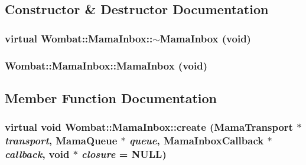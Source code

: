 \subsection{Constructor \& Destructor Documentation}
\hypertarget{classWombat_1_1MamaInbox_aff9af1b965c0992572aa78d707f5d6e4}{
\subsubsection[{$\sim$MamaInbox}]{\setlength{\rightskip}{0pt plus 5cm}virtual Wombat::MamaInbox::$\sim$MamaInbox (void)}}
\label{classWombat_1_1MamaInbox_aff9af1b965c0992572aa78d707f5d6e4}
\hypertarget{classWombat_1_1MamaInbox_adece7f7df25fd1b43de4752305e7db83}{
\subsubsection[{MamaInbox}]{\setlength{\rightskip}{0pt plus 5cm}Wombat::MamaInbox::MamaInbox (void)}}
\label{classWombat_1_1MamaInbox_adece7f7df25fd1b43de4752305e7db83}


\subsection{Member Function Documentation}
\hypertarget{classWombat_1_1MamaInbox_ad42be13e492647407ce0941b0ce41eec}{
\subsubsection[{create}]{\setlength{\rightskip}{0pt plus 5cm}virtual void Wombat::MamaInbox::create ({\bf MamaTransport} $\ast$ {\em transport}, \/  {\bf MamaQueue} $\ast$ {\em queue}, \/  {\bf MamaInboxCallback} $\ast$ {\em callback}, \/  void $\ast$ {\em closure} = {\ttfamily NULL})}}
\label{classWombat_1_1MamaInbox_ad42be13e492647407ce0941b0ce41eec}


